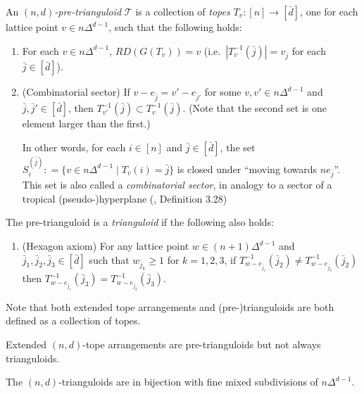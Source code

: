 \documentclass[letterpaper,reqno,11pt]{amsart}
\begin{document}
\begin{definition}\label{def:trianguloid}
    An \emph{$(n,d)$-pre-trianguloid} $\mathcal{T}$ is a collection of \emph{topes} $T_v: [n] \to [\bar{d}]$, one for each lattice point $v\in n\Delta^{d-1}$, such that the following holds: \begin{enumerate}
        \item For each $v\in n\Delta^{d-1}$, $RD(G(T_v)) = v$ (i.e.\ $|T_v^{-1}(\bar{j})| = v_{\bar{j}}$ for each $\bar{j}\in [\bar{d}]$).
        \item (Combinatorial sector) If $v - e_{\bar{j}} = v' - e_{\bar{j}'}$ for some $v, v'\in n\Delta^{d-1}$ and $\bar{j}, \bar{j}'\in [\bar{d}]$, then $T_{v'}^{-1}(\bar{j})\subset T_{v}^{-1}(\bar{j})$. (Note that the second set is one element larger than the first.) 
        
        In other words, for each $i\in [n]$ and $\bar{j}\in [\bar{d}]$, the set $S_{i}^{(\bar{j})}: = \{v\in n\Delta^{d-1}\mid T_v(i) = \bar{j}\}$ is closed under ``moving towards $ne_{\bar{j}}$''. This set is also called a \emph{combinatorial sector}, in analogy to a sector of a tropical (pseudo-)hyperplane (\cite{FieldLattice}, Definition 3.28)
    \end{enumerate}

    The pre-trianguloid is a \emph{trianguloid} if the following also holds: \begin{enumerate}
        \item[(3)] (Hexagon axiom) For any lattice point $w\in (n+1)\Delta^{d-1}$ and $\bar{j}_1, \bar{j}_2, \bar{j}_3 \in [\bar{d}]$ such that $w_{\bar{j}_k} \geq 1$ for $k = 1,2,3$, if $T^{-1}_{w - e_{\bar{j}_1}}(\bar{j}_2) \neq T^{-1}_{w - e_{\bar{j}_3}}(\bar{j}_2)$ then $T^{-1}_{w - e_{\bar{j}_1}}(\bar{j}_3) = T^{-1}_{w - e_{\bar{j}_2}}(\bar{j}_3)$.
    \end{enumerate}
\end{definition}

Note that both extended tope arrangements and (pre-)trianguloids are both defined as a collection of topes.

\begin{theorem}\label{thm:extpretri}
    Extended $(n, d)$-tope arrangements are pre-trianguloids but not always trianguloids.
\end{theorem}

\begin{theorem}\label{thm:trianguloids}
    The $(n, d)$-trianguloids are in bijection with fine mixed subdivisions of $n\Delta^{d-1}$.
\end{theorem}
\end{document}
